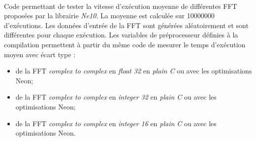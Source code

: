 \documentclass{article}
\begin{document}
\paragraph{}
Code permettant de tester la vitesse d'exécution moyenne de différentes FFT proposées par la librairie \emph{Ne10}. La moyenne est calculée sur \SI{10000000}{} d'exécutions. Les données d'entrée de la FFT sont générées aléatoirement et sont différentes pour chaque exécution. Les variables de préprocesseur définies à la compilation permettent à partir du même code de mesurer le temps d'exécution moyen avec écart type :
\begin{itemize}
    \item de la FFT \emph{complex to complex} en \emph{float 32} en \emph{plain C} ou avec les optimisations Neon;
    \item de la FFT \emph{complex to complex} en \emph{integer 32} en \emph{plain C} ou avec les optimisations Neon;
    \item de la FFT \emph{complex to complex} en \emph{integer 16} en \emph{plain C} ou avec les optimisations Neon.
\end{itemize}
\lstset{language=C++}
\end{document}
